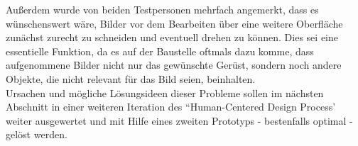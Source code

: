 Außerdem wurde von beiden Testpersonen mehrfach angemerkt, dass es wünschenswert wäre, Bilder vor dem Bearbeiten über eine weitere Oberfläche zunächst zurecht zu schneiden und eventuell drehen zu können.
Dies sei eine essentielle Funktion, da es auf der Baustelle oftmals dazu komme, dass aufgenommene Bilder nicht nur das gewünschte Gerüst, sondern noch andere Objekte, die nicht relevant für das Bild seien, beinhalten. \\

Ursachen und mögliche Lösungsideen dieser Probleme sollen im nächsten Abschnitt in einer weiteren Iteration des ``Human-Centered Design Process' weiter ausgewertet und mit Hilfe eines zweiten Prototyps - bestenfalls optimal - gelöst werden.
